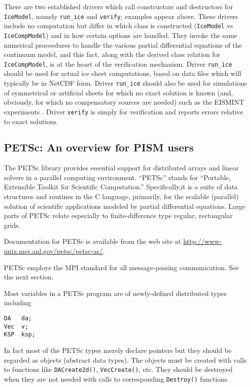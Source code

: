 \documentclass[11pt,final]{amsart}
\renewcommand{\t}[1]{\texttt{#1}}
\begin{document}
There are two established drivers which call constructors and destructors for \t{IceModel}, namely \verb|run_ice| and \verb|verify|; examples appear above.  These drivers include no computation but differ in which class is constructed (\t{IceModel} vs \t{IceCompModel}) and in how certain options are handled.  They invoke the same numerical proceedures to handle the various partial differential equations of the continuum model, and this fact, along with the derived class relation for \t{IceCompModel}, is at the heart of the verification mechanism.  Driver \verb|run_ice| should be used for actual ice sheet computations, based on data files which will typically be in NetCDF form.  Driver \verb|run_ice| should also be used for simulations of symmetrical or artificial sheets for which no exact solution is known (and, obviously, for which no compensatory sources are needed) such as the EISMINT experiments \cite{EISMINT96,EISMINT00}.  Driver \verb|verify| is simply for verification and reports errors relative to exact solutions.

\subsection{PETSc: An overview for PISM users}  The PETSc library \cite{petsc-web-page,petsc-user-ref,petsc-efficient} provides essential support for distributed arrays and linear solvers in a parallel computing environment.  ``PETSc'' stands for ``Portable, Extensible Toolkit for Scientific Computation.''  Specifically,it is a suite of data structures and routines in the C language, primarily, for the scalable (parallel) solution of scientific applications modeled by partial differential equations.  Large parts of PETSc relate especially to finite-difference type regular, rectangular grids.

Documentation for PETSc is available from the web site at \url{http://www-unix.mcs.anl.gov/petsc/petsc-as/}.

PETSc employs the MPI standard for all message-passing communication.  See the next section.

Most variables in a PETSc program are of newly-defined distributed types including
\begin{verbatim}
DA   da;
Vec  v;
KSP  ksp;
\end{verbatim}
In fact most of the PETSc types merely declare pointers but they should be regarded as objects (abstract data types).  The objects must be created with calls to functions like \t{DACreate2d()}, \t{VecCreate()}, etc.  They should be destroyed when they are not needed with calls to corresponding \t{Destroy()} functions.
\end{document}
